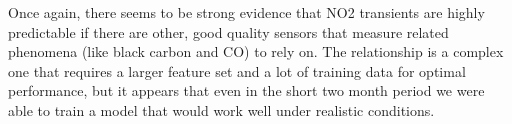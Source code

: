 Once again, there seems to be strong evidence that NO2 transients are highly predictable if there are other, good quality sensors that measure related phenomena (like black carbon and CO) to rely on.  The relationship is a complex one that requires a larger feature set and a lot of training data for optimal performance, but it appears that even in the short two month period we were able to train a model that would work well under realistic conditions.

